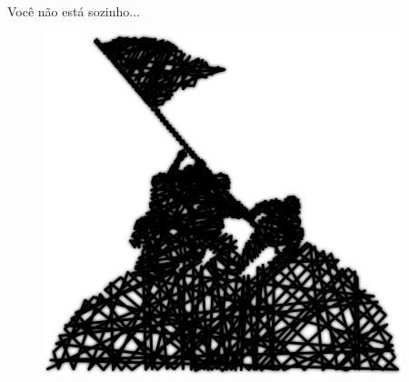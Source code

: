 \documentclass[10pt, compress, aspectratio=169]{beamer}
\begin{document}
\begin{frame}{Você não está sozinho...}
  \begin{figure}
    \centering
    \includegraphics[width=\linewidth,
                     height=0.8\textheight,
                     keepaspectratio]{together}
  \end{figure}
\end{frame}

\maketitle
\end{document}
